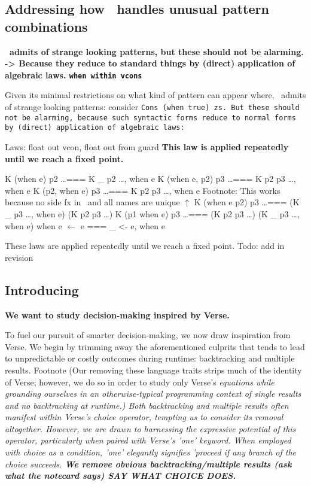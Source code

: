 \documentclass[manuscript,screen,review, 12pt]{acmart}
\begin{document}
\begin{outline}[enumerate]
    
\subsection{Addressing how \PPlus\ handles unusual pattern combinations}
 \bf{\PPlus\ admits of strange looking patterns, but these should not be alarming. }
 \bf{-> Because they reduce to standard things by (direct) application of algebraic laws. }
 \bf{\tt{when} within vcons }

    Given its minimal restrictions on what kind of pattern can appear where,
    \PPlus\ admits of strange looking patterns: consider \tt{Cons (when true)
    zs}. But these should not be alarming, because such syntactic forms reduce
    to normal forms by (direct) application of algebraic laws: 

    
         Laws: float out vcon, float out from guard
         \bf{This law is applied repeatedly until we reach a fixed point.}

         K (when e) p2 \dots === K \_ p2 \dots, when e
         K (when e, p2) p3 \dots  === K p2 p3 \dots, when e
         K (p2, when e) p3 \dots  === K p2 p3 \dots, when e
         Footnote: This works because no side fx in \PPlus\ and all names are unique $\uparrow$ 
         K (when e \pbar p2) p3 \dots === (K \_ p3 \dots, when e) \pbar (K p2 p3 \dots)
         K (p1 \pbar when e) p3 \dots === (K p2 p3 \dots) \pbar (K \_ p3 \dots, when e) 
         when e $\leftarrow$ e === \_ <- e, when e

        
        These laws are applied repeatedly until we reach a fixed point. 
        Todo: add in revision 
\subsection{Introducing \VMinus\ }
 \bf{We want to study decision-making inspired by Verse.}
        
        To fuel our pursuit of smarter decision-making, we now draw inspiration
        from Verse. We begin by trimming away the aforementioned culprits that
        tends to lead to unpredictable or costly outcomes during runtime:
        backtracking and multiple results. Footnote (Our removing these language
        traits strips much of the identity of Verse; however, we do so in order
        to study only Verse's \it{equations} while grounding ourselves in an
        otherwise-typical programming context of single results and no
        backtracking at runtime.) Both backtracking and multiple results often
        manifest within Verse's choice operator, tempting us to consider its
        removal altogether. However, we are drawn to harnessing the expressive
        potential of this operator, particularly when paired with Verse's 'one'
        keyword. When employed with choice as a condition, 'one' elegantly
        signifies 'proceed if any branch of the choice succeeds.
         \bf{We remove obvious backtracking/multiple results (ask what the notecard says)}
        SAY WHAT CHOICE DOES. 


\end{outline}
\end{document}
